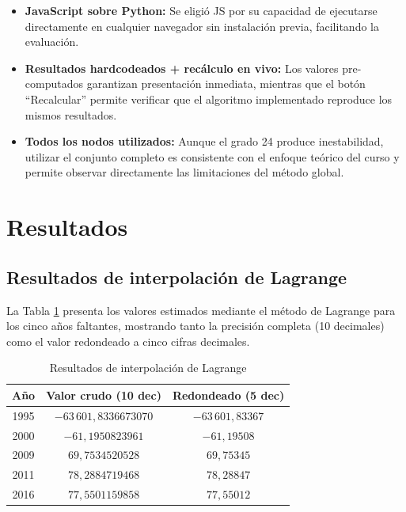 \documentclass[12pt, letterpaper]{article}
\begin{document}
\begin{tcolorbox}[colback=blue!5!white, colframe=blue!60!black, title=Justificación de decisiones de implementación]
\begin{itemize}
    \item \textbf{JavaScript sobre Python:} Se eligió JS por su capacidad de ejecutarse directamente en cualquier navegador sin instalación previa, facilitando la evaluación.
    \item \textbf{Resultados hardcodeados + recálculo en vivo:} Los valores pre-computados garantizan presentación inmediata, mientras que el botón ``Recalcular'' permite verificar que el algoritmo implementado reproduce los mismos resultados.
    \item \textbf{Todos los nodos utilizados:} Aunque el grado 24 produce inestabilidad, utilizar el conjunto completo es consistente con el enfoque teórico del curso y permite observar directamente las limitaciones del método global.
\end{itemize}
\end{tcolorbox}

\section{Resultados}\label{sec:resultados}

\subsection{Resultados de interpolación de Lagrange}\label{subsec:res-lagrange}

La Tabla \ref{tab:lagrange} presenta los valores estimados mediante el método de Lagrange para los cinco años faltantes, mostrando tanto la precisión completa (10 decimales) como el valor redondeado a cinco cifras decimales.

\begin{table}[H]
\centering
\caption{Resultados de interpolación de Lagrange}
\label{tab:lagrange}
\begin{tabular}{@{}cc>{\bfseries}c@{}}
\toprule
\textbf{Año} & \textbf{Valor crudo (10 dec)} & \textbf{Redondeado (5 dec)} \\
\midrule
1995 & $-63\,601{,}8336673070$ & $-63\,601{,}83367$ \\
2000 & $-61{,}1950823961$ & $-61{,}19508$ \\
2009 & $69{,}7534520528$ & $69{,}75345$ \\
2011 & $78{,}2884719468$ & $78{,}28847$ \\
2016 & $77{,}5501159858$ & $77{,}55012$ \\
\bottomrule
\end{tabular}
\end{table}
\end{document}
